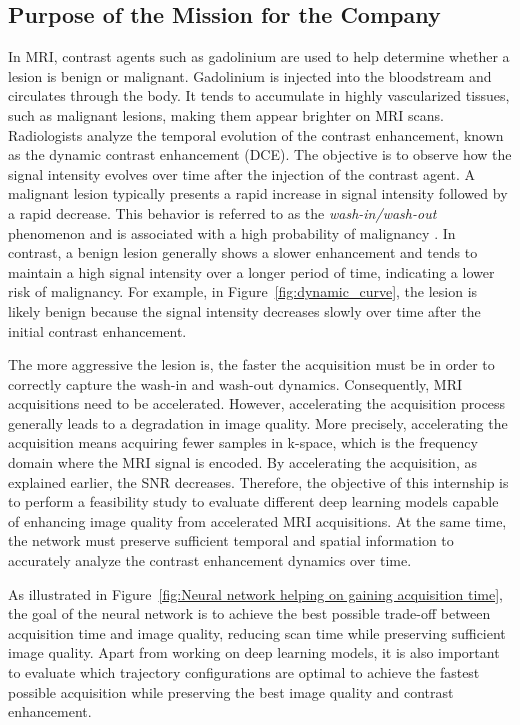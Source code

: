 \documentclass[12pt]{article}
\begin{document}
\subsection{Purpose of the Mission for the Company}

In MRI, contrast agents such as gadolinium are used to help determine whether a lesion is benign or malignant.
Gadolinium is injected into the bloodstream and circulates through the body.
It tends to accumulate in highly vascularized tissues, such as malignant lesions, making them appear brighter on MRI scans. 
Radiologists analyze the temporal evolution of the contrast enhancement, known as the dynamic contrast enhancement (DCE).
The objective is to observe how the signal intensity evolves over time after the injection of the contrast agent. 
A malignant lesion typically presents a rapid increase in signal intensity followed by a rapid decrease. 
This behavior is referred to as the \textit{wash-in/wash-out} phenomenon and is associated with a high probability of malignancy \cite{washinwashout}.
In contrast, a benign lesion generally shows a slower enhancement and tends to maintain a high signal intensity over a longer period of time, indicating a lower risk of malignancy.
For example, in Figure~\ref{fig:dynamic_curve}, the lesion is likely benign because the signal intensity decreases slowly over time after the initial contrast enhancement.
\vspace{0.5cm}

The more aggressive the lesion is, the faster the acquisition must be in order to correctly capture the wash-in and wash-out dynamics.
Consequently, MRI acquisitions need to be accelerated. 
However, accelerating the acquisition process generally leads to a degradation in image quality.
More precisely, accelerating the acquisition means acquiring fewer samples in k-space, which is the frequency domain where the MRI signal is encoded.
By accelerating the acquisition, as explained earlier, the SNR decreases.
Therefore, the objective of this internship is to perform a feasibility study to evaluate different deep learning models capable of enhancing image quality from accelerated MRI acquisitions.
At the same time, the network must preserve sufficient temporal and spatial information to accurately analyze the contrast enhancement dynamics over time.
\vspace{0.5cm}

As illustrated in Figure~\ref{fig:Neural network helping on gaining acquisition time}, the goal of the neural network is to achieve the best possible trade-off between acquisition time and image quality, reducing scan time while preserving sufficient image quality.
Apart from working on deep learning models, it is also important to evaluate which trajectory configurations are optimal to achieve the fastest possible acquisition while preserving the best image quality and contrast enhancement.
\end{document}
